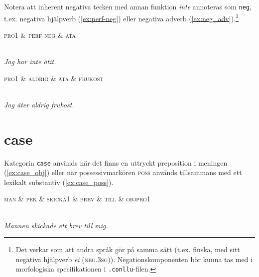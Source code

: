 \documentclass[11pt,a4paper]{article}
\begin{document}
\noindent Notera att inherent negativa tecken med annan funktion \textit{inte} annoteras som \texttt{neg}, t.ex. negativa hjälpverb (\ref{ex:perf-neg}) eller negativa adverb (\ref{ex:neg_adv}).\footnote{Det verkar som att andra språk gör på samma sätt (t.ex. finska, med sitt negativa hjälpverb \textit{ei} (\textsc{neg.3sg})). Negationskomponenten bör kunna tas med i morfologiska specifikationen i \texttt{.conllu}-filen.}

\begin{example}
\label{ex:perf-neg}
\begin{dependency}[theme = simple]
   \begin{deptext}[column sep=1em]
      \textsc{pro1} \& \textsc{perf-neg} \& \textsc{äta} \\
   \end{deptext}
\end{dependency}
\\
\textit{Jag har inte ätit.}
\end{example}

\begin{example}
\label{ex:neg_adv}
\begin{dependency}[theme = simple]
   \begin{deptext}[column sep=1em]
      \textsc{pro1} \& \textsc{aldrig} \& \textsc{äta} \& \textsc{frukost} \\
   \end{deptext}
\end{dependency}
\\
\textit{Jag äter aldrig frukost.}
\end{example}

\section{case}
Kategorin \texttt{case} används när det finns en uttryckt preposition i meningen (\ref{ex:case_obj}) eller när possessivmarkören \textsc{poss} används tillsammans med ett lexikalt substantiv (\ref{ex:case_poss}).

\begin{example}
\label{ex:case_obj}
\begin{dependency}[theme = simple]
   \begin{deptext}[column sep=1em]
      \textsc{man} \& \textsc{pek} \& \textsc{skicka1} \& \textsc{brev} \& \textsc{till} \& \textsc{objpro1} \\
   \end{deptext}
\end{dependency}
\\
\textit{Mannen skickade ett brev till mig.}
\end{example}
\end{document}
